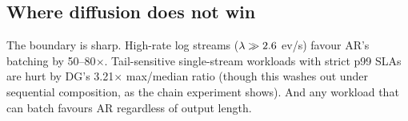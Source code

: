 \subsection{Where diffusion does not win}

The boundary is sharp. High-rate log streams ($\lambda \gg
2.6$ ev/s) favour AR's batching by 50--80$\times$. Tail-sensitive
single-stream workloads with strict p99 SLAs are hurt by DG's 3.21$\times$
max/median ratio (though this washes out under sequential composition, as
the chain experiment shows). And any workload that can batch favours AR
regardless of output length.
